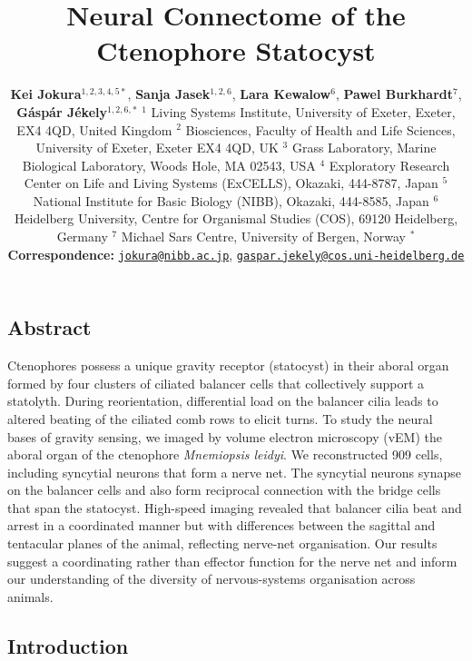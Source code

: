 \documentclass[
  11pt,
]{article}
\title{Neural Connectome of the Ctenophore Statocyst}
\subtitle{\textbf{Kei Jokura}\(^{1,2,3,4,5*}\), \textbf{Sanja
Jasek}\(^{1,2,6}\), \textbf{Lara Kewalow}\(^{6}\), \textbf{Pawel
Burkhardt}\(^{7}\), \textbf{Gáspár Jékely}\(^{1,2,6,*}\) \(^{1}\) Living
Systems Institute, University of Exeter, Exeter, EX4 4QD, United Kingdom
\(^{2}\) Biosciences, Faculty of Health and Life Sciences, University of
Exeter, Exeter EX4 4QD, UK \(^{3}\) Grass Laboratory, Marine Biological
Laboratory, Woods Hole, MA 02543, USA \(^{4}\) Exploratory Research
Center on Life and Living Systems (ExCELLS), Okazaki, 444-8787, Japan
\(^{5}\) National Institute for Basic Biology (NIBB), Okazaki, 444-8585,
Japan \(^{6}\) Heidelberg University, Centre for Organismal Studies
(COS), 69120 Heidelberg, Germany \(^{7}\) Michael Sars Centre,
University of Bergen, Norway \textbf{\(^{*}\) Correspondence:}
\href{mailto:jokura@nibb.ac.jp}{\nolinkurl{jokura@nibb.ac.jp}},
\href{mailto:gaspar.jekely@cos.uni-heidelberg.de}{\nolinkurl{gaspar.jekely@cos.uni-heidelberg.de}}}
\author{}
\date{}
\begin{document}
\maketitle

\linenumbers


\subsection{Abstract}\label{abstract}

Ctenophores possess a unique gravity receptor (statocyst) in their
aboral organ formed by four clusters of ciliated balancer cells that
collectively support a statolyth. During reorientation, differential
load on the balancer cilia leads to altered beating of the ciliated comb
rows to elicit turns. To study the neural bases of gravity sensing, we
imaged by volume electron microscopy (vEM) the aboral organ of the
ctenophore \emph{Mnemiopsis leidyi}. We reconstructed 909 cells,
including syncytial neurons that form a nerve net. The syncytial neurons
synapse on the balancer cells and also form reciprocal connection with
the bridge cells that span the statocyst. High-speed imaging revealed
that balancer cilia beat and arrest in a coordinated manner but with
differences between the sagittal and tentacular planes of the animal,
reflecting nerve-net organisation. Our results suggest a coordinating
rather than effector function for the nerve net and inform our
understanding of the diversity of nervous-systems organisation across
animals.

\subsection{Introduction}\label{introduction}
\end{document}
